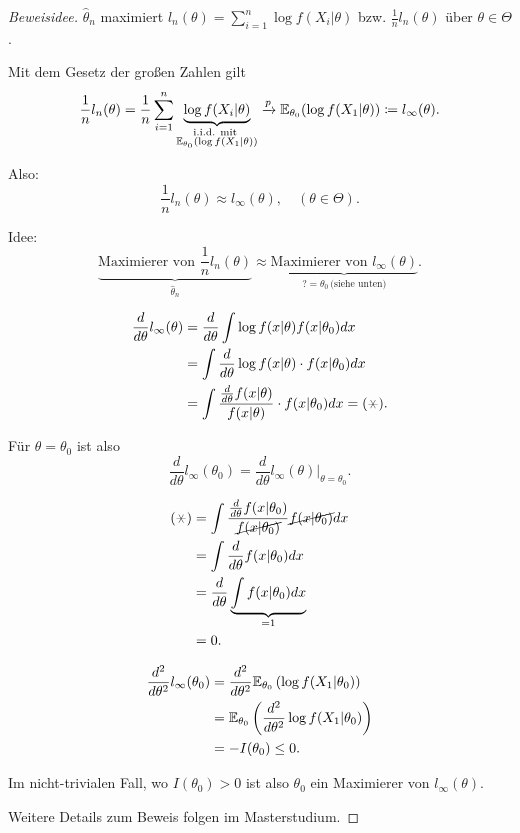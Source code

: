 \documentclass{tstextbook}
\begin{document}
	\begin{proof}[Beweisidee]
		$ \hat{\theta}_n $ maximiert $ l_n(\theta)=\sum_{i=1}^{n} \log f(X_i|\theta) $ bzw. $ \frac{1}{n}l_n(\theta) $ über $ \theta\in\Theta $. 
		
		Mit dem Gesetz der großen Zahlen gilt
		\[
		\frac{1}{n}l_n(\theta) = \frac{1}{n}\sum_{i=1}^{n} \underbrace{\log f(X_i|\theta)}_{\substack{\text{i.i.d. mit } \\ \mathbb E_{\theta_0}(\log f(X_1|\theta))}} \xrightarrow{p} \mathbb E_{\theta_0}(\log f(X_1|\theta)) \coloneqq l_\infty(\theta).
		\]
		
		Also:
		\[
		\frac{1}{n}l_n(\theta) \approx l_\infty(\theta), \quad (\theta\in\Theta).
		\]
		
		Idee: 
		\[
		\underbrace{\text{Maximierer von }\frac{1}{n}l_n(\theta)}_{\hat{\theta}_n} \approx \underbrace{\text{Maximierer von }l_\infty(\theta)}_{?=\theta_0 \, \text{(siehe unten)}}.
		\]
		
		\[
		\begin{aligned}
			\frac{d}{d\theta}l_\infty(\theta) & = \frac{d}{d\theta}\int\log f(x|\theta) f(x|\theta_0) dx \\
			& = \int \frac{d}{d\theta}\log f(x|\theta)\cdot f(x|\theta_0) dx \\
			& = \int \frac{\frac{d}{d\theta}f(x|\theta)}{f(x|\theta)}\cdot f(x|\theta_0) dx = (\hexstar).
		\end{aligned}
		\]
		
		Für $ \theta = \theta_0 $ ist also 
		\[
		\frac{d}{d\theta}l_\infty(\theta_0) = \frac{d}{d\theta}l_\infty(\theta)\Big|_{\theta=\theta_0} .
		\]
		
		\[
		\begin{aligned}
			(\hexstar) & = \int \frac{\frac{d}{d\theta}f(x|\theta_0)}{\cancel{f(x|\theta_0)}} \cancel{f(x|\theta_0)} dx \\
			& = \int \frac{d}{d\theta} f(x|\theta_0) dx \\
			& = \frac{d}{d\theta} \underbrace{\int f(x|\theta_0) dx}_{=1} \\
			& = 0.
		\end{aligned}
		\]
		
		\[
		\begin{aligned}
			\frac{d^2}{d\theta^2} l_\infty(\theta_0) & = \frac{d^2}{d\theta^2} \mathbb E_{\theta_0} \left(\log f(X_1|\theta_0)\right) \\
			& = \mathbb E_{\theta_0}\left(\frac{d^2}{d\theta^2}\log f(X_1|\theta_0)\right) \\
			& = - I(\theta_0) \le 0.
		\end{aligned}
		\]
		
		Im nicht-trivialen Fall, wo $ I(\theta_0)>0 $ ist also $ \theta_0 $ ein Maximierer von $ l_\infty(\theta) $. 
		
		Weitere Details zum Beweis folgen im Masterstudium.
	\end{proof}
	
\end{document}

